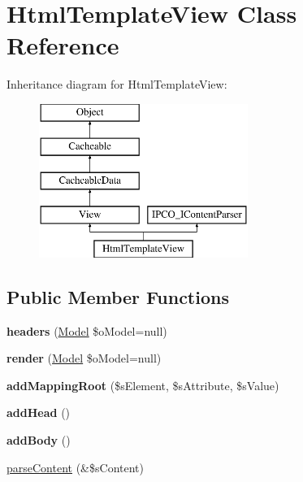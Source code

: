 \hypertarget{class_html_template_view}{\section{Html\-Template\-View Class Reference}
\label{class_html_template_view}
}
Inheritance diagram for Html\-Template\-View\-:\begin{figure}[H]
\begin{center}
\leavevmode
\includegraphics[height=5.000000cm]{class_html_template_view}
\end{center}
\end{figure}
\subsection*{Public Member Functions}
\begin{DoxyCompactItemize}
\item 
\hypertarget{class_html_template_view_a32ba343bf84f96aee736e42e67224494}{{\bfseries headers} (\hyperlink{class_model}{Model} \$o\-Model=null)}\label{class_html_template_view_a32ba343bf84f96aee736e42e67224494}

\item 
\hypertarget{class_html_template_view_aa9802b303e9bfbee332196acb9c373f3}{{\bfseries render} (\hyperlink{class_model}{Model} \$o\-Model=null)}\label{class_html_template_view_aa9802b303e9bfbee332196acb9c373f3}

\item 
\hypertarget{class_html_template_view_ae8aa0c8970b059ef68ff7d7f8dd06ff7}{{\bfseries add\-Mapping\-Root} (\$s\-Element, \$s\-Attribute, \$s\-Value)}\label{class_html_template_view_ae8aa0c8970b059ef68ff7d7f8dd06ff7}

\item 
\hypertarget{class_html_template_view_a20f7cbae155c7808fe8cab66d2449cbd}{{\bfseries add\-Head} ()}\label{class_html_template_view_a20f7cbae155c7808fe8cab66d2449cbd}

\item 
\hypertarget{class_html_template_view_a880ee1fc6207e0fa1e6e0820799388b6}{{\bfseries add\-Body} ()}\label{class_html_template_view_a880ee1fc6207e0fa1e6e0820799388b6}

\item 
\hyperlink{class_html_template_view_afac9d3c71f0beefc5a0013d5f58f106f}{parse\-Content} (\&\$s\-Content)
\end{DoxyCompactItemize}
